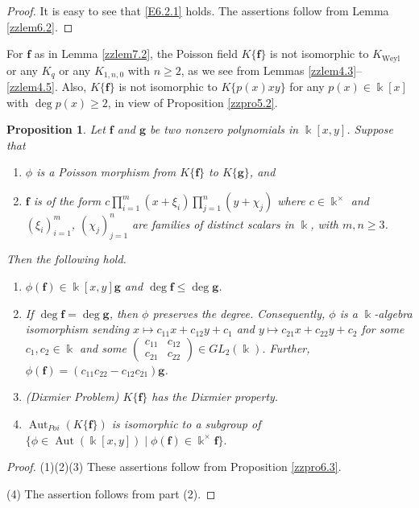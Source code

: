 \documentclass[12pt]{amsart}
\theoremstyle{plain}
\newtheorem{proposition}[theorem]{Proposition}
\numberwithin{theorem}{section}
\numberwithin{equation}{theorem}
\theoremstyle{definition}
\DeclareMathOperator{\Aut}{Aut}
\newcommand \bff {{\mathbf{f}}}
\newcommand \bfg {{\mathbf{g}}}
\DeclareMathOperator{\Weyl}{Weyl}
\newcommand \Kweyl {K_{\Weyl}}
\newcommand \kx {\Bbbk^\times}
\begin{document}
\begin{proof} It is easy to see that \eqref{E6.2.1}
holds. The assertions follow from Lemma \ref{zzlem6.2}.
\end{proof}

For $\bff$ as in Lemma \ref{zzlem7.2}, the 
Poisson field $K\{\bff\}$ is not isomorphic 
to $\Kweyl$ or any $K_q$ or any $K_{1,n,0}$ 
with $n\ge2$, as we see from Lemmas 
\ref{zzlem4.3}--\ref{zzlem4.5}. Also, 
$K\{\bff\}$ is not isomorphic to $K\{p(x)xy\}$ 
for any $p(x) \in \Bbbk[x]$ with 
$\deg p(x) \ge 2$, in view of 
Proposition \ref{zzpro5.2}.


\begin{proposition}
\label{zzpro7.3}
Let $\bff$ and $\bfg$ be two nonzero polynomials in $\Bbbk[x,y]$. Suppose that
\begin{enumerate}
\item[(a)]
$\phi$ is a Poisson morphism from $K\{\bff\}$ to $K\{\bfg\}$, and
\item[(b)]
$\bff$ is of the form 
$c\prod_{i=1}^m (x+\xi_i) \prod_{j=1}^{n} (y+\chi_j)$
where $c \in \kx$ and $(\xi_i)_{i=1}^{m}$, $(\chi_j)_{j=1}^n$ 
are families of distinct scalars in $\Bbbk$, with $m,n\ge3$.
\end{enumerate}
Then the following hold.
\begin{enumerate}
\item[(1)]
$\phi(\bff) \in \Bbbk[x,y] \bfg$ and $\deg \bff\leq \deg \bfg$.  
\item[(2)]
If $\deg \bff=\deg \bfg$, then  $\phi$ preserves the degree.
Consequently, $\phi$ is a $\Bbbk$-algebra isomorphism sending 
$x\mapsto c_{11}x+c_{12}y+c_1$ and $y\mapsto c_{21}x+c_{22}y+c_2$ 
for some $c_1,c_2\in \Bbbk$ and some $\begin{pmatrix} c_{11}&c_{12}\\
c_{21}&c_{22}\end{pmatrix} \in GL_2(\Bbbk)$. Further, $\phi(\bff) = (c_{11}c_{22} - c_{12}c_{21}) \bfg$.
\item[(3)]{\rm{(Dixmier Problem)}}
$K\{\bff\}$ has the Dixmier property.
\item[(4)]
$\Aut_{Poi}(K\{\bff\})$ is isomorphic to a subgroup of $\{\phi\in \Aut(\Bbbk[x,y])
\mid \phi(\bff) \in \kx \bff\}.$
\end{enumerate}
\end{proposition}

\begin{proof} 
(1)(2)(3) These assertions follow from Proposition \ref{zzpro6.3}. 

(4) The assertion follows from part (2). 
\end{proof}
\end{document}
